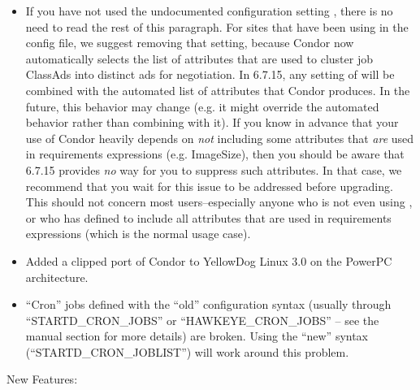 \begin{itemize}

\item If you have not used the undocumented configuration setting
, there is no need to read the rest of
this paragraph.  For sites that have been using
 in the config file, we suggest
removing that setting, because Condor now automatically selects the
list of attributes that are used to cluster job ClassAds into distinct
ads for negotiation.  In 6.7.15, any setting of
 will be combined with the automated
list of attributes that Condor produces.  In the future, this behavior
may change (e.g. it might override the automated behavior rather than
combining with it).  If you know in advance that your use of Condor
heavily depends on  \emph{not}
including some attributes that \emph{are} used in requirements
expressions (e.g.  ImageSize), then you should be aware that 6.7.15
provides \emph{no} way for you to suppress such attributes.  In
that case, we recommend that you wait for this issue to be addressed
before upgrading.
This should not concern most users--especially anyone who is not even
using , or who has defined
 to include all attributes that are
used in requirements expressions (which is the normal usage case).

\item Added a clipped port of Condor to YellowDog Linux 3.0 on the
PowerPC architecture.

\item ``Cron'' jobs defined with the ``old'' configuration syntax
(usually through ``STARTD\_CRON\_JOBS'' or ``HAWKEYE\_CRON\_JOBS'' --
see the  manual section for more details) are broken.
Using the ``new'' syntax (``STARTD\_CRON\_JOBLIST'') will work around
this problem.

\end{itemize}

\noindent New Features:

